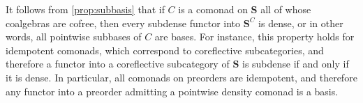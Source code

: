\documentclass[11pt, oneside, article]{memoir}
\theoremstyle{plain}
\theoremstyle{definition}
\theoremstyle{remark}
\newenvironment{remark}
{\renewcommand\qedsymbol{$\lrcorner$}%
  \pushQED{\qed}\myremark}
{\popQED\endmyremark}
\DeclarePairedDelimiter{\gen}{\langle}{\rangle}
\newcommand{\namedcat}[1]{\mathbf{#1}}
\newcommand{\cat}[1]{\mathbf{#1}}
\newcommand{\Set}{\namedcat{Set}}
\newcommand{\CoalgOn}[2]{{#2}^{#1}}
\newcommand{\CoalgSet}[1]{\CoalgOn{#1}{\Set}}
\newcommand{\CoalgS}[1]{\CoalgOn{#1}{\bS}}
\newcommand{\carr}{\Sigma}
\newcommand{\car}[1]{\carr^{#1}}
\newcommand{\carP}{\car{\cP}}
\newcommand{\ph}[1]{#1}
\newcommand{\cmnd}[1]{{#1}}
\newcommand{\cC}{\cmnd{C}}
\newcommand{\bB}{\cat{B}}
\newcommand{\bS}{\cat{S}}
\newcommand{\pP}{\ph{P}}
\newcommand{\cP}{\gen{\pP}}
\newcommand{\CS}{\CoalgS{\cC}}
\newcommand{\PSet}{\CoalgSet{\cP}}
\begin{document}

\begin{remark}
  It follows from \cref{prop:subbasis} that if $\cC$ is a comonad on
  $\bS$ all of whose coalgebras are cofree, then every subdense
  functor into $\CS$ is dense, or in other words, all pointwise
  subbases of $\cC$ are bases. For instance, this property holds for
  idempotent comonads, which correspond to coreflective subcategories,
  and therefore a functor into a coreflective subcategory of $\bS$ is
  subdense if and only if it is dense. In particular, all comonads on
  preorders are idempotent, and therefore any functor into a preorder
  admitting a pointwise density comonad is a basis.
\end{remark}
\end{document}
